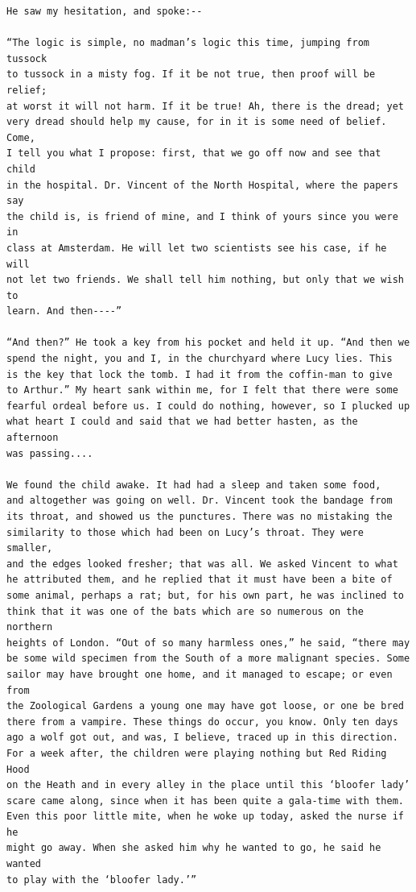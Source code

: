 \documentclass{article}
\begin{document}
\begin{verbatim}
He saw my hesitation, and spoke:--

“The logic is simple, no madman’s logic this time, jumping from tussock
to tussock in a misty fog. If it be not true, then proof will be relief;
at worst it will not harm. If it be true! Ah, there is the dread; yet
very dread should help my cause, for in it is some need of belief. Come,
I tell you what I propose: first, that we go off now and see that child
in the hospital. Dr. Vincent of the North Hospital, where the papers say
the child is, is friend of mine, and I think of yours since you were in
class at Amsterdam. He will let two scientists see his case, if he will
not let two friends. We shall tell him nothing, but only that we wish to
learn. And then----”

“And then?” He took a key from his pocket and held it up. “And then we
spend the night, you and I, in the churchyard where Lucy lies. This
is the key that lock the tomb. I had it from the coffin-man to give
to Arthur.” My heart sank within me, for I felt that there were some
fearful ordeal before us. I could do nothing, however, so I plucked up
what heart I could and said that we had better hasten, as the afternoon
was passing....

We found the child awake. It had had a sleep and taken some food,
and altogether was going on well. Dr. Vincent took the bandage from
its throat, and showed us the punctures. There was no mistaking the
similarity to those which had been on Lucy’s throat. They were smaller,
and the edges looked fresher; that was all. We asked Vincent to what
he attributed them, and he replied that it must have been a bite of
some animal, perhaps a rat; but, for his own part, he was inclined to
think that it was one of the bats which are so numerous on the northern
heights of London. “Out of so many harmless ones,” he said, “there may
be some wild specimen from the South of a more malignant species. Some
sailor may have brought one home, and it managed to escape; or even from
the Zoological Gardens a young one may have got loose, or one be bred
there from a vampire. These things do occur, you know. Only ten days
ago a wolf got out, and was, I believe, traced up in this direction.
For a week after, the children were playing nothing but Red Riding Hood
on the Heath and in every alley in the place until this ‘bloofer lady’
scare came along, since when it has been quite a gala-time with them.
Even this poor little mite, when he woke up today, asked the nurse if he
might go away. When she asked him why he wanted to go, he said he wanted
to play with the ‘bloofer lady.’”


\end{verbatim}
\end{document}
